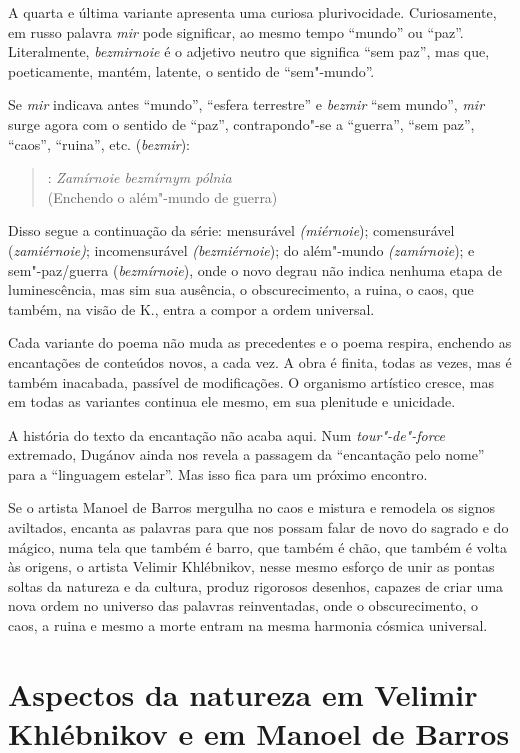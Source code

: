 A quarta e última variante apresenta uma curiosa plurivocidade.
Curiosamente, em russo palavra \emph{mir} pode significar, ao mesmo
tempo ``mundo'' ou ``paz''. Literalmente, \emph{bezmirnoie} é o adjetivo
neutro que significa ``sem paz'', mas que, poeticamente, mantém,
latente, o sentido de ``sem"-mundo''.

Se \emph{mir} indicava antes ``mundo'', ``esfera terrestre'' e
\emph{bezmir} ``sem mundo'', \emph{mir} surge agora com o sentido de
``paz'', contrapondo"-se a ``guerra'', ``sem paz'', ``caos'', ``ruina'',
etc. (\emph{bezmir}):

\begin{verse}
: \emph{Zamírnoie bezmírnym pólnia} \\
(Enchendo o além"-mundo de guerra)
\end{verse}

Disso segue a continuação da série: mensurável \emph{(miérnoie});
comensurável (\emph{zamiérnoie)}; incomensurável \emph{(bezmiérnoie});
do além"-mundo \emph{(zamírnoie}); e sem"-paz/guerra (\emph{bezmírnoie}),
onde o novo degrau não indica nenhuma etapa de luminescência, mas sim
sua ausência, o obscurecimento, a ruina, o caos, que também, na visão de
K., entra a compor a ordem universal.

Cada variante do poema não muda as precedentes e o poema respira,
enchendo as encantações de conteúdos novos, a cada vez. A obra é finita,
todas as vezes, mas é também inacabada, passível de modificações. O
organismo artístico cresce, mas em todas as variantes continua ele
mesmo, em sua plenitude e unicidade.

A história do texto da encantação não acaba aqui. Num
\emph{tour"-de"-force} extremado, Dugánov ainda nos revela a passagem da
``encantação pelo nome'' para a ``linguagem estelar''. Mas isso fica
para um próximo encontro.

Se o artista Manoel de Barros mergulha no caos e mistura e remodela os
signos aviltados, encanta as palavras para que nos possam falar de novo
do sagrado e do mágico, numa tela que também é barro, que também é chão,
que também é volta às origens, o artista Velimir Khlébnikov, nesse mesmo
esforço de unir as pontas soltas da natureza e da cultura, produz
rigorosos desenhos, capazes de criar uma nova ordem no universo das
palavras reinventadas, onde o obscurecimento, o caos, a ruina e mesmo a
morte entram na mesma harmonia cósmica universal.

\chapter{Aspectos da natureza em Velimir Khlébnikov e em Manoel de Barros}

